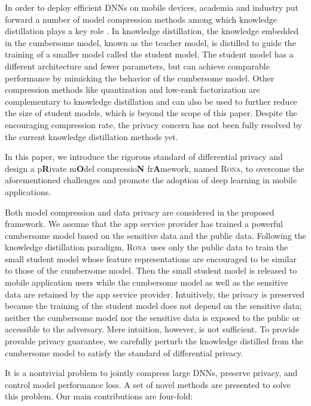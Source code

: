 \documentclass[letterpaper]{article} %
\newcommand*\system{\textsc{Rona}}
\begin{document}
In order to deploy efficient DNNs on mobile devices, academia and industry put forward a number of model compression methods among which knowledge distillation plays a key role \cite{bucila2006model}. In knowledge distillation, the knowledge embedded in the cumbersome model, known as the teacher model, is distilled to guide the training of a smaller model called the student model. The student model has a different architecture and fewer parameters, but can achieve comparable performance by mimicking the behavior of the cumbersome model. Other compression methods like quantization and low-rank factorization \cite{han2015deep,howard2017mobile} are complementary to knowledge distillation and can also be used to further reduce the size of student models, which is beyond the scope of this paper. Despite the encouraging compression rate, the privacy concern has not been fully resolved by the current knowledge distillation methods yet. 

In this paper, we introduce the rigorous standard of differential privacy \cite{dwork2011diff} and design a p\textbf{R}ivate m\textbf{O}del compressio\textbf{N} fr\textbf{A}mework, named \system, to overcome the aforementioned challenges and promote the adoption of deep learning in mobile applications.

Both model compression and data privacy are considered in the proposed framework. We assume that the app service provider has trained a powerful cumbersome model based on the sensitive data and the public data. Following the knowledge distillation paradigm, \system\ uses only the public data to train the small student model whose feature representations are encouraged to be similar to those of the cumbersome model. Then the small student model is released to mobile application users while the cumbersome model as well as the sensitive data are retained by the app service provider. Intuitively, the privacy is preserved because the training of the student model does not depend on the sensitive data; neither the cumbersome model nor the sensitive data is exposed to the public or accessible to the adversary. Mere intuition, however, is not sufficient. To provide provable privacy guarantee, we carefully perturb the knowledge distilled from the cumbersome model to satisfy the standard of differential privacy.

It is a nontrivial problem to jointly compress large DNNs, preserve privacy, and control model performance loss. A set of novel methods are presented to solve this problem. Our main contributions are four-fold:
\end{document}
